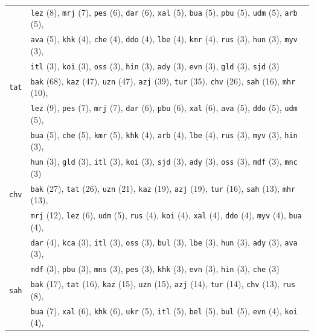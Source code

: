 \begin{center}
\begin{longtable}{ll}
 & \texttt{lez} (8), \texttt{mrj} (7), \texttt{pes} (6), \texttt{dar} (6), \texttt{xal} (5), \texttt{bua} (5), \texttt{pbu} (5), \texttt{udm} (5), \texttt{arb} (5),\\
 & \texttt{ava} (5), \texttt{khk} (4), \texttt{che} (4), \texttt{ddo} (4), \texttt{lbe} (4), \texttt{kmr} (4), \texttt{rus} (3), \texttt{hun} (3), \texttt{myv} (3),\\
 & \texttt{itl} (3), \texttt{koi} (3), \texttt{oss} (3), \texttt{hin} (3), \texttt{ady} (3), \texttt{evn} (3), \texttt{gld} (3), \texttt{sjd} (3) \\
\texttt{tat} & \texttt{bak} (68), \texttt{kaz} (47), \texttt{uzn} (47), \texttt{azj} (39), \texttt{tur} (35), \texttt{chv} (26), \texttt{sah} (16), \texttt{mhr} (10),\\
 & \texttt{lez} (9), \texttt{pes} (7), \texttt{mrj} (7), \texttt{dar} (6), \texttt{pbu} (6), \texttt{xal} (6), \texttt{ava} (5), \texttt{ddo} (5), \texttt{udm} (5),\\
 & \texttt{bua} (5), \texttt{che} (5), \texttt{kmr} (5), \texttt{khk} (4), \texttt{arb} (4), \texttt{lbe} (4), \texttt{rus} (3), \texttt{myv} (3), \texttt{hin} (3),\\
 & \texttt{hun} (3), \texttt{gld} (3), \texttt{itl} (3), \texttt{koi} (3), \texttt{sjd} (3), \texttt{ady} (3), \texttt{oss} (3), \texttt{mdf} (3), \texttt{mnc} (3) \\
\texttt{chv} & \texttt{bak} (27), \texttt{tat} (26), \texttt{uzn} (21), \texttt{kaz} (19), \texttt{azj} (19), \texttt{tur} (16), \texttt{sah} (13), \texttt{mhr} (13),\\
 & \texttt{mrj} (12), \texttt{lez} (6), \texttt{udm} (5), \texttt{rus} (4), \texttt{koi} (4), \texttt{xal} (4), \texttt{ddo} (4), \texttt{myv} (4), \texttt{bua} (4),\\
 & \texttt{dar} (4), \texttt{kca} (3), \texttt{itl} (3), \texttt{oss} (3), \texttt{bul} (3), \texttt{lbe} (3), \texttt{hun} (3), \texttt{ady} (3), \texttt{ava} (3),\\
 & \texttt{mdf} (3), \texttt{pbu} (3), \texttt{mns} (3), \texttt{pes} (3), \texttt{khk} (3), \texttt{evn} (3), \texttt{hin} (3), \texttt{che} (3) \\
\texttt{sah} & \texttt{bak} (17), \texttt{tat} (16), \texttt{kaz} (15), \texttt{uzn} (15), \texttt{azj} (14), \texttt{tur} (14), \texttt{chv} (13), \texttt{rus} (8),\\
 & \texttt{bua} (7), \texttt{xal} (6), \texttt{khk} (6), \texttt{ukr} (5), \texttt{itl} (5), \texttt{bel} (5), \texttt{bul} (5), \texttt{evn} (4), \texttt{koi} (4),\\

\end{longtable}
\end{center}
